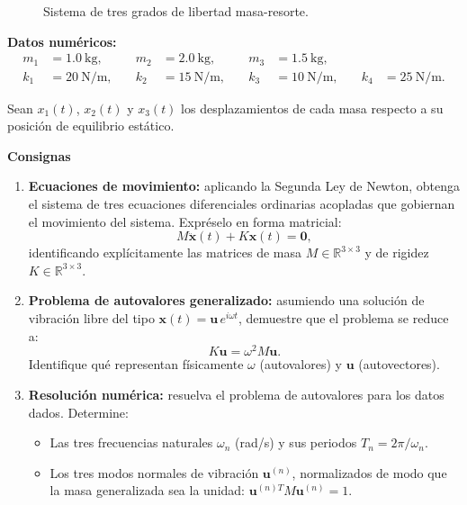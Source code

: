 \documentclass[11pt]{article}
\begin{document}
\begin{question}
\begin{figure}[h]
\begin{center}
			\caption{Sistema de tres grados de libertad masa-resorte.}
			\label{fig:sistema}
		\end{center}
	\end{figure}


	\noindent\textbf{Datos numéricos:}
	\[
		\begin{aligned}
			m_1 & = 1.0\ \text{kg}, & \quad m_2         & = 2.0\ \text{kg}, & \quad m_3 & = 1.5\ \text{kg}, \\
			k_1 & = 20\ \text{N/m}, & \quad k_2         & = 15\ \text{N/m}, & \quad k_3 & = 10\ \text{N/m},
			    & \quad k_4         & = 25\ \text{N/m}.
		\end{aligned}
	\]

	Sean $x_1(t)$, $x_2(t)$ y $x_3(t)$ los desplazamientos de cada masa respecto a su
	posición de equilibrio estático.

	\noindent	\textbf{Consignas}

	\begin{enumerate}
		\item \textbf{Ecuaciones de movimiento:} aplicando la Segunda Ley de Newton,
		      obtenga el sistema de tres ecuaciones diferenciales ordinarias acopladas que gobiernan
		      el movimiento del sistema. Expréselo en forma matricial:
		      \[
			      M\ddot{\mathbf{x}}(t) + K\mathbf{x}(t) = \mathbf{0},
		      \]
		      identificando explícitamente las matrices de masa $M \in \mathbb{R}^{3\times 3}$ y
		      de rigidez $K \in \mathbb{R}^{3\times 3}$.

		\item \textbf{Problema de autovalores generalizado:} asumiendo una solución de
		      vibración libre del tipo $\mathbf{x}(t) = \mathbf{u}\,e^{i\omega t}$, demuestre que
		      el problema se reduce a:
		      \[
			      K\mathbf{u} = \omega^2 M\mathbf{u}.
		      \]
		      Identifique qué representan físicamente $\omega$ (autovalores) y $\mathbf{u}$
		      (autovectores).

		\item \textbf{Resolución numérica:} resuelva el problema de autovalores para los
		      datos dados. Determine:
		      \begin{itemize}
			      \item Las tres frecuencias naturales $\omega_n$ (rad/s) y sus periodos
			            $T_n = 2\pi/\omega_n$.
			      \item Los tres modos normales de vibración $\mathbf{u}^{(n)}$, normalizados
			            de modo que la masa generalizada sea la unidad:
			            $\mathbf{u}^{(n)T} M \mathbf{u}^{(n)} = 1$.
		      \end{itemize}


\end{enumerate}
\end{question}
\end{document}
